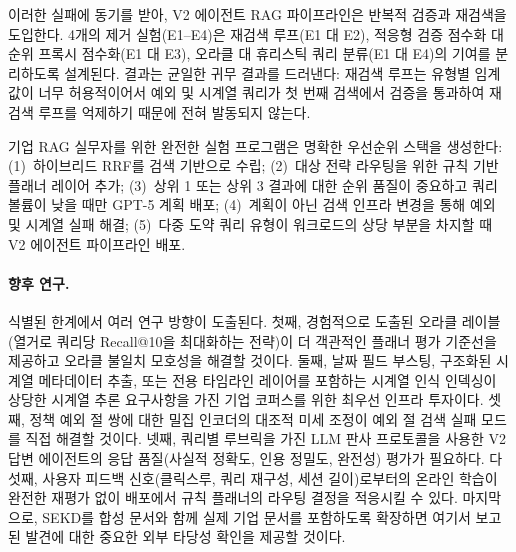 \documentclass[11pt, a4paper]{article}
\begin{document}
이러한 실패에 동기를 받아, V2 에이전트 RAG 파이프라인은 반복적 검증과 재검색을 도입한다. 4개의 제거 실험(E1--E4)은 재검색 루프(E1 대 E2), 적응형 검증 점수화 대 순위 프록시 점수화(E1 대 E3), 오라클 대 휴리스틱 쿼리 분류(E1 대 E4)의 기여를 분리하도록 설계된다. 결과는 균일한 귀무 결과를 드러낸다: 재검색 루프는 유형별 임계값이 너무 허용적이어서 예외 및 시계열 쿼리가 첫 번째 검색에서 검증을 통과하여 재검색 루프를 억제하기 때문에 전혀 발동되지 않는다.

기업 RAG 실무자를 위한 완전한 실험 프로그램은 명확한 우선순위 스택을 생성한다: (1)~하이브리드 RRF를 검색 기반으로 수립; (2)~대상 전략 라우팅을 위한 규칙 기반 플래너 레이어 추가; (3)~상위 1 또는 상위 3 결과에 대한 순위 품질이 중요하고 쿼리 볼륨이 낮을 때만 GPT-5 계획 배포; (4)~계획이 아닌 검색 인프라 변경을 통해 예외 및 시계열 실패 해결; (5)~다중 도약 쿼리 유형이 워크로드의 상당 부분을 차지할 때 V2 에이전트 파이프라인 배포.

\paragraph{향후 연구.} 식별된 한계에서 여러 연구 방향이 도출된다. 첫째, 경험적으로 도출된 오라클 레이블(열거로 쿼리당 Recall@10을 최대화하는 전략)이 더 객관적인 플래너 평가 기준선을 제공하고 오라클 불일치 모호성을 해결할 것이다. 둘째, 날짜 필드 부스팅, 구조화된 시계열 메타데이터 추출, 또는 전용 타임라인 레이어를 포함하는 시계열 인식 인덱싱이 상당한 시계열 추론 요구사항을 가진 기업 코퍼스를 위한 최우선 인프라 투자이다. 셋째, 정책 예외 절 쌍에 대한 밀집 인코더의 대조적 미세 조정이 예외 절 검색 실패 모드를 직접 해결할 것이다. 넷째, 쿼리별 루브릭을 가진 LLM 판사 프로토콜을 사용한 V2 답변 에이전트의 응답 품질(사실적 정확도, 인용 정밀도, 완전성) 평가가 필요하다. 다섯째, 사용자 피드백 신호(클릭스루, 쿼리 재구성, 세션 길이)로부터의 온라인 학습이 완전한 재평가 없이 배포에서 규칙 플래너의 라우팅 결정을 적응시킬 수 있다. 마지막으로, SEKD를 합성 문서와 함께 실제 기업 문서를 포함하도록 확장하면 여기서 보고된 발견에 대한 중요한 외부 타당성 확인을 제공할 것이다.


\end{document}

